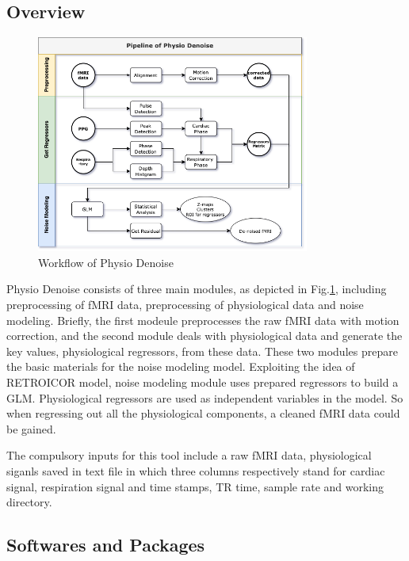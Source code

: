 \subsection{Overview}

\begin{figure}
    \centering
    \includegraphics[width=0.8\textwidth]{Figures/pipe.png}
    \caption{Workflow of Physio Denoise}
    \label{fig:modules}
\end{figure} 

Physio Denoise consists of three main modules, as depicted in Fig.\ref{fig:modules}, 
including preprocessing of fMRI data, preprocessing of physiological data  and noise modeling.
Briefly, the first modeule preprocesses the raw fMRI data with motion correction, 
and the second module deals with physiological data and generate the key values,
physiological regressors, from these data. 
These two modules prepare the basic materials for the noise modeling model. 
Exploiting the idea of RETROICOR model, 
noise modeling module uses prepared regressors to build a GLM.
Physiological regressors are used as independent variables in the model. 
So when regressing out all the physiological components, a cleaned fMRI data could be gained. 

The compulsory inputs for this tool include a raw fMRI data, 
physiological siganls saved in text file in which three columns respectively stand for cardiac signal, 
respiration signal and time stamps,
TR time, sample rate and working directory.

\subsection{Softwares and Packages}

